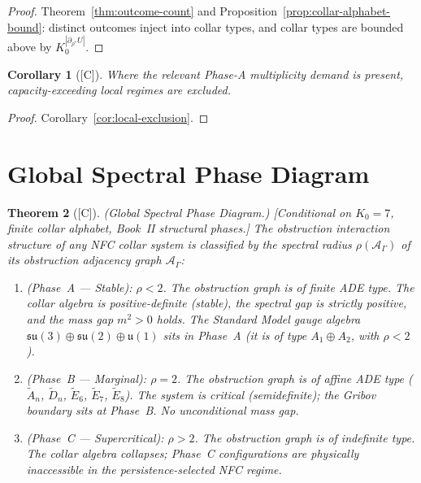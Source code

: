 \documentclass[12pt,oneside]{amsbook}
\theoremstyle{plain}
\newtheorem{theorem}{Theorem}[section]
\newtheorem{corollary}[theorem]{Corollary}
\theoremstyle{definition}
\theoremstyle{remark}
\newcommand{\status}[1]{\textup{[#1]}}
\begin{document}
\begin{proof}
Theorem~\ref{thm:outcome-count} and
Proposition~\ref{prop:collar-alphabet-bound}: distinct outcomes inject
into collar types, and collar types are bounded above by $K_0^{|\partial_{\rho^*}U|}$.
\end{proof}

\begin{corollary}[\status{C}]\label{cor:exclusion-corollary}
Where the relevant Phase-A multiplicity demand is present,
capacity-exceeding local regimes are excluded.
\end{corollary}

\begin{proof}
Corollary~\ref{cor:local-exclusion}.
\end{proof}

\section{Global Spectral Phase Diagram}
\label{sec:spectral-phase}

\begin{theorem}[\status{C}]\label{thm:global-spectral-phase}
\textup{(Global Spectral Phase Diagram.)}
\textup{[Conditional on $K_0=7$, finite collar alphabet,
Book~II structural phases.]}
The obstruction interaction structure of any NFC collar system
is classified by the spectral radius $\rho(\mathcal{A}_\Gamma)$
of its obstruction adjacency graph $\mathcal{A}_\Gamma$:
\begin{enumerate}[label=\textup{(\Roman*)}]
  \item \textup{(Phase~A --- Stable):} $\rho < 2$.  The
    obstruction graph is of finite ADE type.  The collar algebra
    is positive-definite (stable), the spectral gap is strictly
    positive, and the mass gap $m^2 > 0$ holds.  The Standard
    Model gauge algebra $\mathfrak{su}(3)\oplus\mathfrak{su}(2)
    \oplus\mathfrak{u}(1)$ sits in Phase~A (it is of type
    $A_1 \oplus A_2$, with $\rho < 2$).
  \item \textup{(Phase~B --- Marginal):} $\rho = 2$.  The
    obstruction graph is of affine ADE type ($\tilde A_n$,
    $\tilde D_n$, $\tilde E_6$, $\tilde E_7$, $\tilde E_8$).
    The system is critical (semidefinite); the Gribov boundary
    sits at Phase~B.  No unconditional mass gap.
  \item \textup{(Phase~C --- Supercritical):} $\rho > 2$.
    The obstruction graph is of indefinite type.  The collar
    algebra collapses; Phase~C configurations are physically
    inaccessible in the persistence-selected NFC regime.
\end{enumerate}
\end{theorem}
\end{document}
